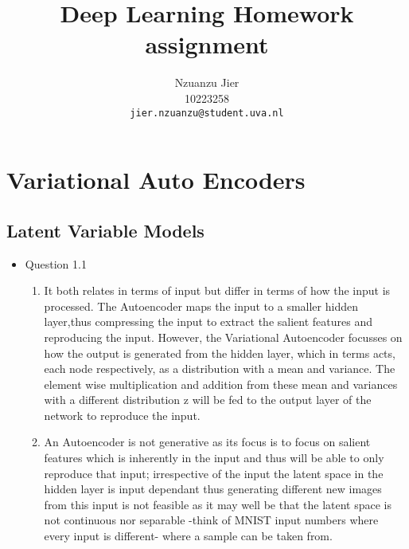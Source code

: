 \documentclass{article}
\title{Deep Learning Homework assignment}
\author{%
  Nzuanzu Jier \\
  10223258 \\
  \texttt{jier.nzuanzu@student.uva.nl} \\
}
\begin{document}

\maketitle

\section{Variational Auto Encoders}
  \subsection{Latent Variable Models}
    \begin{itemize}
      \item Question 1.1
      \begin{enumerate}
        \item It both relates in terms of input but differ in terms of how the input is processed. The Autoencoder maps the input to a smaller hidden layer,thus compressing the input to extract the salient features and reproducing the input. However, the Variational Autoencoder focusses on how the output is generated from the hidden layer, which in terms acts, each node respectively, as a distribution with a mean and variance. The element wise multiplication and addition from these mean and variances with a different distribution z will be fed to the output layer of the network to reproduce the input. 
        \item  An Autoencoder is not generative as its focus is to focus on salient features which is inherently in the input and thus will be able to only reproduce that input; irrespective of the input the latent space in the hidden layer is input dependant thus generating different new images from this input is not feasible as it may well be that the latent space is not continuous nor separable -think of MNIST input numbers where every input is different- where a sample can be taken from. 
      \end{enumerate}
    \end{itemize}
\end{document}
